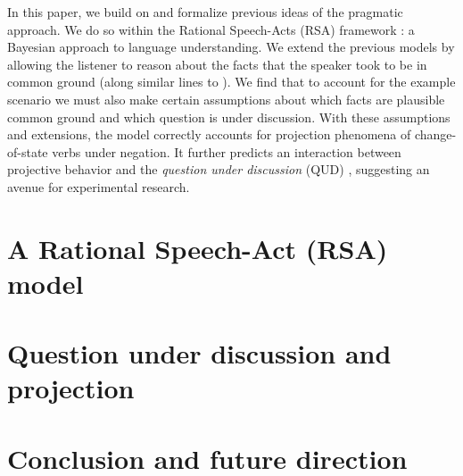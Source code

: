 \documentclass[10pt,letterpaper]{article}
\begin{document}
In this paper, we build on and formalize previous ideas of the pragmatic approach.
We do so within the Rational Speech-Acts (RSA) framework  \cite{FrankGoodman2012:Predicting-Pragmatic-Reasoning-,GoodmanStuhlmuller2013:Knowledge-and-I}: a Bayesian 
approach to language understanding.
We extend the previous models by allowing the listener to reason about the facts that the speaker took to be in common ground (along similar lines to \cite{degen2015}).
We find that to account for the example scenario we must also make certain assumptions about which facts are plausible common ground and which question is under discussion.
With these assumptions and extensions, the model correctly accounts for projection phenomena of change-of-state verbs under negation.
It further predicts an interaction between projective behavior and the  
 \emph{question under discussion} (QUD) \cite{Roberts2012:Information-Structure}, suggesting an avenue for experimental research.



\section{A Rational Speech-Act (RSA) model}
\label{sec:RSA}


\section{Question under discussion and projection}
\label{sec:Discussion}


\section{Conclusion and future direction}
\label{sec:Conclusion}









\setlength{\bibleftmargin}{.125in}
\setlength{\bibindent}{-\bibleftmargin}


\end{document}
